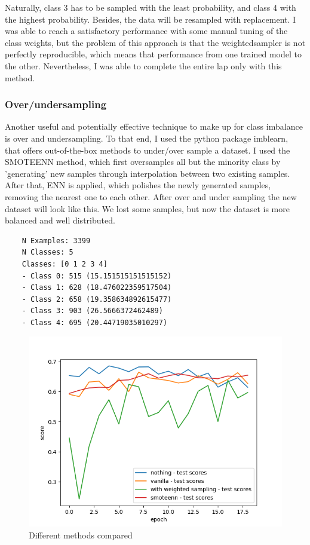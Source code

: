 \documentclass[12pt,a4paper,oneside]{article}
\begin{document}
Naturally, class 3 has to be sampled with the least probability, and class 4
with the highest probability. Besides, the data will be resampled with
replacement. I was able to reach a satisfactory performance with some manual
tuning of the class weights, but the problem of this approach is that the
weightedsampler is not perfectly reproducible, which means that performance from
one trained model to the other. Nevertheless, I was able to complete the entire
lap only with this method.

\subsubsection{Over/undersampling}

Another useful and potentially effective technique to make up for class
imbalance is over and undersampling. To that end, I used the python package
imblearn, that offers out-of-the-box methods to under/over sample a dataset. I
used the SMOTEENN method, which first oversamples all but the minority class by
'generating' new samples through interpolation between two existing samples.
After that, ENN is applied, which polishes the newly generated samples, removing
the nearest one to each other. After over and under sampling the new dataset
will look like this. We lost some samples, but now the dataset is more balanced
and well distributed.
\begin{verbatim}
    N Examples: 3399
    N Classes: 5
    Classes: [0 1 2 3 4]
    - Class 0: 515 (15.151515151515152)
    - Class 1: 628 (18.476022359517504)
    - Class 2: 658 (19.358634892615477)
    - Class 3: 903 (26.5666372462489)
    - Class 4: 695 (20.44719035010297)
\end{verbatim}

\begin{figure}[H]
    \includegraphics{figures/compare.png}
    \caption{Different methods compared}
\end{figure}
\end{document}
